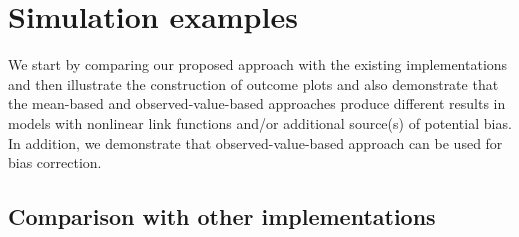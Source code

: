 \section{Simulation examples}

We start by comparing our proposed approach with the existing implementations and then illustrate the construction of outcome plots and also demonstrate that the mean-based and observed-value-based approaches produce different results in models with nonlinear link functions and/or additional source(s) of potential bias. In addition, we demonstrate that observed-value-based approach can be used for bias correction.

\subsection{Comparison with other implementations}

